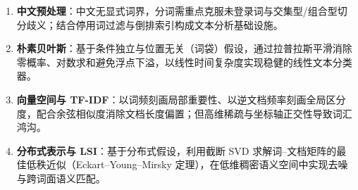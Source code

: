 \begin{summary}[本章核心要点回顾]\label{sum:ch07}
\begin{enumerate}
  \item \textbf{中文预处理}：中文无显式词界，分词需重点克服未登录词与交集型/组合型切分歧义；结合停用词过滤与倒排索引构成文本分析基础设施。
  \item \textbf{朴素贝叶斯}：基于条件独立与位置无关（词袋）假设，通过拉普拉斯平滑消除零概率、对数求和避免浮点下溢，以线性时间复杂度实现稳健的线性文本分类器。
  \item \textbf{向量空间与 TF-IDF}：以词频刻画局部重要性、以逆文档频率刻画全局区分度，配合余弦相似度消除文档长度偏置；但高维稀疏与坐标轴正交性导致词汇鸿沟。
  \item \textbf{分布式表示与 LSI}：基于分布式假设，利用截断 SVD 求解词--文档矩阵的最佳低秩近似（Eckart--Young--Mirsky 定理），在低维稠密语义空间中实现去噪与跨词面语义匹配。
\end{enumerate}
\end{summary}

